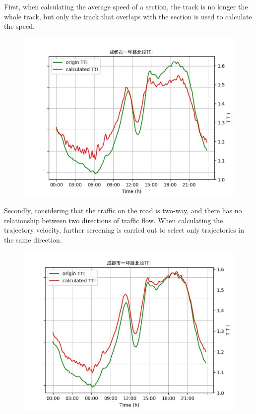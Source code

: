 \documentclass[fontset=none]{ctexart}
\theoremstyle{definition}
\theoremstyle{remark}
\begin{document}
First, when calculating the average speed of a section, the track is no longer the whole track, but only the track that overlaps with the section is used to calculate the speed.
\begin{figure}[htb]
  \centering
  \includegraphics[width=\textwidth]{images/tti3-5.jpg}
\end{figure}

\clearpage
Secondly, considering that the traffic on the road is two-way, and there has no relationship between two directions of traffic flow. When calculating the trajectory velocity, further screening is carried out to select only trajectories in the same direction.
\begin{figure}[htb]
  \centering
  \includegraphics[width=\textwidth]{images/tti3-6.jpg}
\end{figure}
\end{document}

